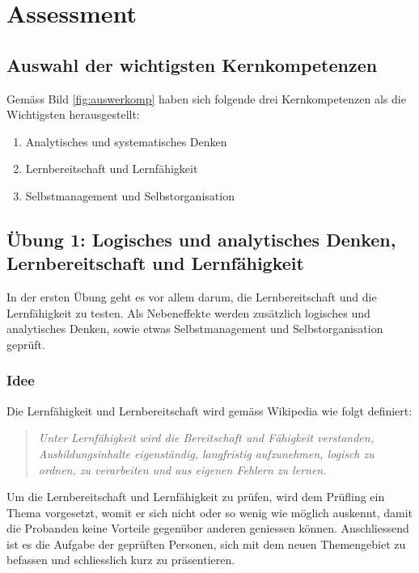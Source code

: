 \chapter{Assessment}\label{Assessment}

\section{Auswahl der wichtigsten Kernkompetenzen}

Gemäss Bild \ref{fig:auswerkomp} haben sich folgende drei Kernkompetenzen als die Wichtigsten herausgestellt:

\begin{enumerate} 
\item{Analytisches und systematisches Denken}
\item{Lernbereitschaft und Lernfähigkeit}
\item{Selbstmanagement und Selbstorganisation}
\end{enumerate}

\section{Übung 1: Logisches und analytisches Denken, Lernbereitschaft und Lernfähigkeit}

In der ersten Übung geht es vor allem darum, die Lernbereitschaft und die Lernfähigkeit zu testen. Als Nebeneffekte werden zusätzlich logisches und analytisches Denken, sowie etwas Selbstmanagement und Selbstorganisation geprüft.

\subsection{Idee}

Die Lernfähigkeit und Lernbereitschaft wird gemäss Wikipedia \cite{wiki:Lernfahigkeit} wie folgt definiert:
\begin{quote} 
\textit{Unter Lernfähigkeit wird die Bereitschaft und Fähigkeit verstanden, Ausbildungsinhalte eigenständig, langfristig aufzunehmen, logisch zu ordnen, zu verarbeiten und aus eigenen Fehlern zu lernen.}
\end{quote}

Um die Lernbereitschaft und Lernfähigkeit zu prüfen, wird dem Prüfling ein Thema vorgesetzt, womit er sich nicht oder so wenig wie möglich auskennt, damit die Probanden keine Vorteile gegenüber anderen geniessen können. Anschliessend ist es die Aufgabe der geprüften Personen, sich mit dem neuen Themengebiet zu befassen und schliesslich kurz zu präsentieren.

